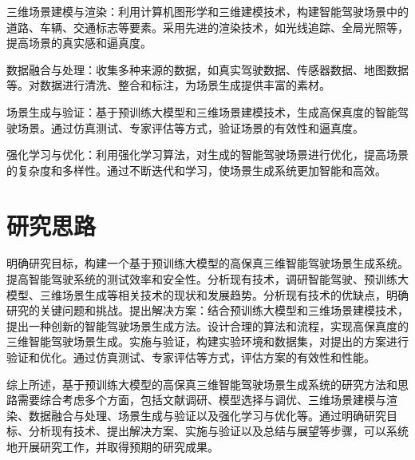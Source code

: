 \documentclass{article}
\begin{document}
三维场景建模与渲染：利用计算机图形学和三维建模技术，构建智能驾驶场景中的道路、车辆、交通标志等要素。采用先进的渲染技术，如光线追踪、全局光照等，提高场景的真实感和逼真度。

数据融合与处理：收集多种来源的数据，如真实驾驶数据、传感器数据、地图数据等。对数据进行清洗、整合和标注，为场景生成提供丰富的素材。

场景生成与验证：基于预训练大模型和三维场景建模技术，生成高保真度的智能驾驶场景。通过仿真测试、专家评估等方式，验证场景的有效性和逼真度。

强化学习与优化：利用强化学习算法，对生成的智能驾驶场景进行优化，提高场景的复杂度和多样性。通过不断迭代和学习，使场景生成系统更加智能和高效。

\section{研究思路}
明确研究目标，构建一个基于预训练大模型的高保真三维智能驾驶场景生成系统。提高智能驾驶系统的测试效率和安全性。分析现有技术，调研智能驾驶、预训练大模型、三维场景生成等相关技术的现状和发展趋势。分析现有技术的优缺点，明确研究的关键问题和挑战。提出解决方案：结合预训练大模型和三维场景建模技术，提出一种创新的智能驾驶场景生成方法。设计合理的算法和流程，实现高保真度的三维智能驾驶场景生成。实施与验证，构建实验环境和数据集，对提出的方案进行验证和优化。通过仿真测试、专家评估等方式，评估方案的有效性和性能。

综上所述，基于预训练大模型的高保真三维智能驾驶场景生成系统的研究方法和思路需要综合考虑多个方面，包括文献调研、模型选择与调优、三维场景建模与渲染、数据融合与处理、场景生成与验证以及强化学习与优化等。通过明确研究目标、分析现有技术、提出解决方案、实施与验证以及总结与展望等步骤，可以系统地开展研究工作，并取得预期的研究成果。
\end{document}
